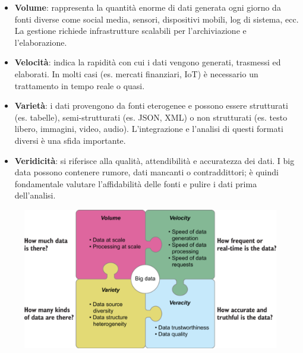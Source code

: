 \begin{itemize}
    \item \textbf{Volume}: rappresenta la quantità enorme di dati generata ogni giorno da fonti diverse come social media, sensori, dispositivi mobili, log di sistema, ecc. La gestione richiede infrastrutture scalabili per l’archiviazione e l’elaborazione.

    \item \textbf{Velocità}: indica la rapidità con cui i dati vengono generati, trasmessi ed elaborati. In molti casi (es. mercati finanziari, IoT) è necessario un trattamento in tempo reale o quasi.

    \item \textbf{Varietà}: i dati provengono da fonti eterogenee e possono essere strutturati (es. tabelle), 
    semi-strutturati (es. JSON, XML) o non strutturati (es. testo libero, immagini, video, audio). L'integrazione e l'analisi di questi formati diversi è una sfida importante.

    \item \textbf{Veridicità}: si riferisce alla qualità, attendibilità e accuratezza dei dati. 
    I big data possono contenere rumore, dati mancanti o contraddittori; è quindi fondamentale valutare l’affidabilità delle fonti e pulire i dati prima dell’analisi.
\end{itemize}
\begin{figure}[th]
    \centering
    \includegraphics[width=0.65\linewidth]{GraphDataEngineering//img/4v.png}
\end{figure}

